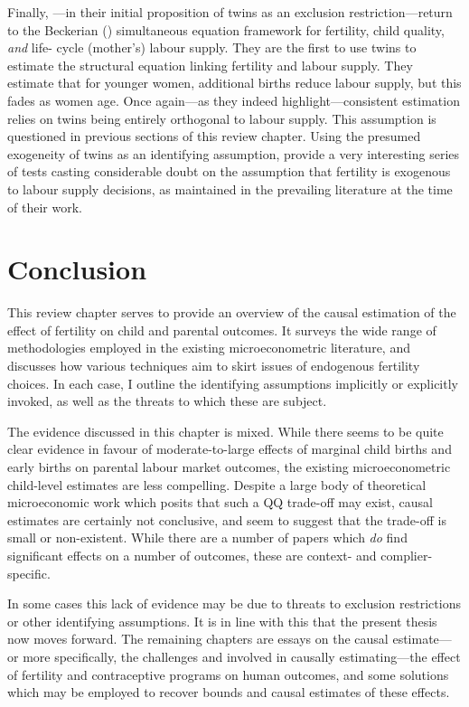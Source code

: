 Finally, \citet{RosenzweigWolpin1980b}---in their initial proposition of twins as
an exclusion restriction---return to the Beckerian (\citeyear{BeckerLewis1973})
simultaneous equation framework for fertility, child quality, \emph{and} life-%
cycle (mother's) labour supply.  They are the first to use twins to estimate
the structural equation linking fertility and labour supply.  They estimate
that for younger women, additional births reduce labour supply, but this fades
as women age.  Once again---as they indeed highlight---consistent estimation
relies on twins being entirely orthogonal to labour supply.  This assumption 
is questioned in previous sections of this review chapter. Using the presumed 
exogeneity of twins as an identifying assumption, \citet{RosenzweigWolpin1980b} 
provide a very interesting series of tests casting considerable doubt on the 
assumption that fertility is exogenous to labour supply decisions, as maintained 
in the prevailing literature at the time of their work.


\section{Conclusion}
This review chapter serves to provide an overview of the causal estimation of 
the effect of fertility on child and parental outcomes.  It surveys the wide 
range of methodologies employed in the existing microeconometric literature, and 
discusses how various techniques aim to skirt issues of endogenous fertility 
choices.  In each case, I outline the identifying assumptions implicitly or
explicitly invoked, as well as the threats to which these are subject.

The evidence discussed in this chapter is mixed.  While there seems to be 
quite clear evidence in favour of moderate-to-large effects of marginal child 
births and early births on parental labour market outcomes, the existing 
microeconometric child-level estimates are less compelling.  Despite a large
body of theoretical microeconomic work which posits that such a QQ trade-off 
may exist, causal estimates are certainly not conclusive, and seem to suggest 
that the trade-off is small or non-existent.  While there are a number of 
papers which \emph{do} find significant effects on a number of outcomes, these 
are context- and complier-specific.

In some cases this lack of evidence may be due to threats to exclusion 
restrictions or other identifying assumptions. It is in line with this that 
the present thesis now moves forward.  The remaining chapters are essays on the 
causal estimate---or more specifically, the challenges and involved in causally 
estimating---the effect of fertility and contraceptive programs on human 
outcomes, and some solutions which may be employed to recover bounds and causal
estimates of these effects.

